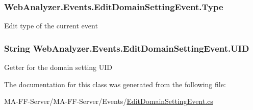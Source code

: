 \subsubsection[{Type}]{ Web\+Analyzer.\+Events.\+Edit\+Domain\+Setting\+Event.\+Type\hspace{0.3cm}{\ttfamily [get]}}\label{class_web_analyzer_1_1_events_1_1_edit_domain_setting_event_a36f36d7fa2adf9fb69c62c4dbdcf034e}


Edit type of the current event 

\hypertarget{class_web_analyzer_1_1_events_1_1_edit_domain_setting_event_ad1c58d61b04b924664078c684161f861}{}
\subsubsection[{U\+I\+D}]{\setlength{\rightskip}{0pt plus 5cm}String Web\+Analyzer.\+Events.\+Edit\+Domain\+Setting\+Event.\+U\+I\+D\hspace{0.3cm}{\ttfamily [get]}}\label{class_web_analyzer_1_1_events_1_1_edit_domain_setting_event_ad1c58d61b04b924664078c684161f861}


Getter for the domain setting U\+I\+D 



The documentation for this class was generated from the following file\+:\begin{DoxyCompactItemize}
\item 
M\+A-\/\+F\+F-\/\+Server/\+M\+A-\/\+F\+F-\/\+Server/\+Events/\hyperlink{_edit_domain_setting_event_8cs}{Edit\+Domain\+Setting\+Event.\+cs}\end{DoxyCompactItemize}
